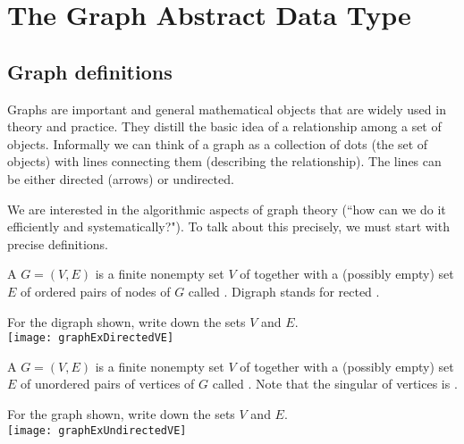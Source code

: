 \part{The Graph Abstract Data Type}
\label{ch:graphadt} 

\chapter{Graph definitions} %
\label{sec:graphdefs}
Graphs are important and general mathematical objects that are widely used in theory and practice. 
They distill the basic idea of a relationship among a set of objects. 
Informally we can think of a graph as a collection of dots (the set of objects) with lines connecting them (describing the relationship). 
The lines can be either directed (arrows) or undirected.

We are interested in the algorithmic aspects of graph theory (``how can we do it efficiently and systematically?").  
To talk about this precisely, we must start with precise definitions.

\begin{Definition}\label{def:digraph} 
A  $G=(V,E)$ is a  finite nonempty set $V$ of  
together with a (possibly empty) set $E$ of ordered pairs of nodes of $G$ called . 
Digraph stands for rected .
\end{Definition}

\begin{Boxample}[0] \label{ex:digraph}
For the digraph shown, write down the sets $V$ and $E$.\\
\newline 
\texttt{[image: graphExDirectedVE]}
\end{Boxample}

\begin{Definition}\label{def:graph}
A  $G = (V, E)$ is a finite nonempty  set $V$ of 
 together with a (possibly empty) set $E$ of unordered
pairs of vertices of $G$ called . 
Note that the singular of vertices is .
\end{Definition}

\begin{Boxample}[1] \label{ex:graph}
For the graph shown, write down the sets $V$ and $E$.\\
\newline 
\texttt{[image: graphExUndirectedVE]}
\end{Boxample}

